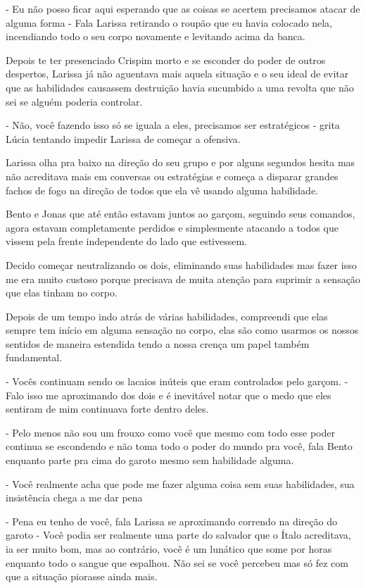- Eu não posso ficar aqui esperando que as coisas se acertem precisamos atacar de alguma forma - Fala Larissa retirando o roupão que eu havia colocado nela, incendiando todo o seu corpo novamente e levitando acima da banca.

Depois te ter presenciado Crispim morto e se esconder do poder de outros despertos, Larissa já não aguentava mais aquela situação e o seu ideal de evitar que as habilidades causassem destruição havia sucumbido a uma revolta que não sei se alguém poderia controlar.

- Não, você fazendo isso só se iguala a eles, precisamos ser estratégicos - grita Lúcia tentando impedir Larissa de começar a ofensiva.

Larissa olha pra baixo na direção do seu grupo e por alguns segundos hesita mas não acreditava mais em conversas ou estratégias e começa a disparar grandes fachos de fogo na direção de todos que ela vê usando alguma habilidade.

Bento e Jonas que até então estavam juntos ao garçom, seguindo seus comandos, agora estavam completamente perdidos e simplesmente atacando a todos que vissem pela frente independente do lado que estivessem.

 Decido começar neutralizando os dois, eliminando suas habilidades mas fazer isso me era muito custoso porque precisava de muita atenção para suprimir a sensação que elas tinham no corpo.

Depois de um tempo indo atrás de várias habilidades, compreendi que elas sempre tem início em alguma sensação no corpo, elas são como usarmos os nossos sentidos de maneira estendida tendo a nossa crença um papel também fundamental.

- Vocês continuam sendo os lacaios inúteis que eram controlados pelo garçom. - Falo isso me aproximando dos dois e é inevitável notar que o medo que eles sentiram de mim continuava forte dentro deles.

- Pelo menos não sou um frouxo como você que mesmo com todo esse poder continua se escondendo e não toma todo o poder do mundo pra você, fala Bento enquanto parte pra cima do garoto mesmo sem habilidade alguma.

- Você realmente acha que pode me fazer alguma coisa sem suas habilidades, sua insistência chega a me dar pena

- Pena eu tenho de você, fala Larissa se aproximando correndo na direção do garoto - Você podia ser realmente uma parte do salvador que o Ítalo acreditava, ia ser muito bom, mas ao contrário, você é um lunático que some por horas enquanto todo o sangue que espalhou. Não sei se você percebeu mas só fez com que a situação piorasse ainda mais.

